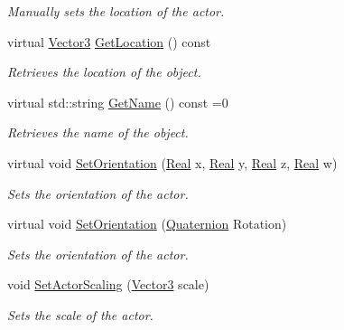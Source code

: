 \begin{DoxyCompactItemize}
\begin{DoxyCompactList}\small\item\em Manually sets the location of the actor. \item\end{DoxyCompactList}\item 
virtual \hyperlink{classphys_1_1Vector3}{Vector3} \hyperlink{classphys_1_1ActorBase_a777b4ea4d6881af76c646b1ba9324d96}{GetLocation} () const 
\begin{DoxyCompactList}\small\item\em Retrieves the location of the object. \item\end{DoxyCompactList}\item 
virtual std::string \hyperlink{classphys_1_1ActorBase_a8309f5bd133c936abe3a856b0240159f}{GetName} () const =0
\begin{DoxyCompactList}\small\item\em Retrieves the name of the object. \item\end{DoxyCompactList}\item 
virtual void \hyperlink{classphys_1_1ActorBase_adbf0cc77031f22597a799fd0f7f8216d}{SetOrientation} (\hyperlink{namespacephys_af7eb897198d265b8e868f45240230d5f}{Real} x, \hyperlink{namespacephys_af7eb897198d265b8e868f45240230d5f}{Real} y, \hyperlink{namespacephys_af7eb897198d265b8e868f45240230d5f}{Real} z, \hyperlink{namespacephys_af7eb897198d265b8e868f45240230d5f}{Real} w)
\begin{DoxyCompactList}\small\item\em Sets the orientation of the actor. \item\end{DoxyCompactList}\item 
virtual void \hyperlink{classphys_1_1ActorBase_ac4b0bf1eff730d94f72d04957efea69d}{SetOrientation} (\hyperlink{classphys_1_1Quaternion}{Quaternion} Rotation)
\begin{DoxyCompactList}\small\item\em Sets the orientation of the actor. \item\end{DoxyCompactList}\item 
void \hyperlink{classphys_1_1ActorBase_a1ac7c692d7f88f39ebb1c1db5deba251}{SetActorScaling} (\hyperlink{classphys_1_1Vector3}{Vector3} scale)
\begin{DoxyCompactList}\small\item\em Sets the scale of the actor. \item\end{DoxyCompactList}\item 

\end{DoxyCompactItemize}
